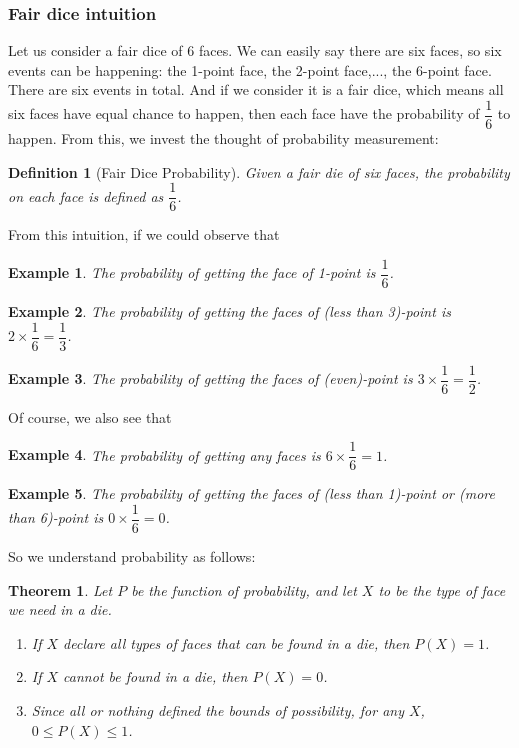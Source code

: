 \documentclass[12pt]{article}
\newtheorem{definition}{Definition}[section]
\newtheorem*{theorem}{Theorem}
\newtheorem*{example}{Example}
\begin{document}
    \subsubsection*{Fair dice intuition}

    Let us consider a fair dice of 6 faces. We can easily say there are six faces, so six events can be happening: the 1-point face, the 2-point face,..., the 6-point face. There are six events in total. And if we consider it is a fair dice, which means all six faces have equal chance to happen, then each face have the probability of $\dfrac{1}{6}$ to happen. From this, we invest the thought of probability measurement:

    \begin{definition}[Fair Dice Probability]
        Given a fair die of six faces, the probability on each face is defined as $\dfrac{1}{6}$.
    \end{definition}

    From this intuition, if we could observe that 
    
    \begin{example}
        The probability of getting the face of 1-point is $\dfrac{1}{6}$.
    \end{example}

    \begin{example}
        The probability of getting the faces of (less than 3)-point is $2\times \dfrac{1}{6}=\dfrac{1}{3}$.
    \end{example}

    \begin{example}
        The probability of getting the faces of (even)-point is $3\times \dfrac{1}{6}=\dfrac{1}{2}$.
    \end{example}

    Of course, we also see that 

    \begin{example}
        The probability of getting any faces is $6\times \dfrac{1}{6}=1$.
    \end{example}

    \begin{example}
        The probability of getting the faces of (less than 1)-point or (more than 6)-point is $0\times \dfrac{1}{6}=0$.
    \end{example}

    So we understand probability as follows:

    \begin{theorem}
        Let $P$ be the function of probability, and let $X$ to be the type of face we need in a die. \begin{enumerate}
            \item If $X$ declare all types of faces that can be found in a die, then $P(X)=1$.
            \item If $X$ cannot be found in a die, then $P(X)=0$.
            \item Since all or nothing defined the bounds of possibility, for any $X$, $0\leq P(X)\leq 1$.
        \end{enumerate}
    \end{theorem}
\end{document}
